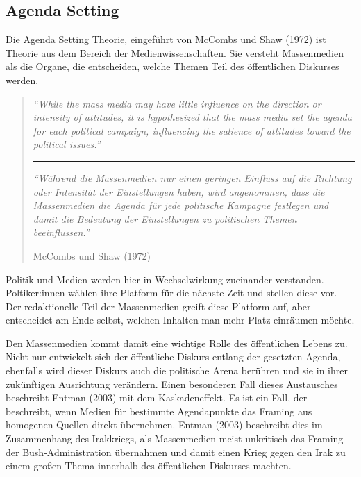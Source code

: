 \documentclass[
  11pt,
]{article}
\begin{document}
\hypertarget{agenda-setting}{%
\subsection{Agenda Setting}\label{agenda-setting}}

Die Agenda Setting Theorie, eingeführt von McCombs und Shaw (1972) ist
Theorie aus dem Bereich der Medienwissenschaften. Sie versteht
Massenmedien als die Organe, die entscheiden, welche Themen Teil des
öffentlichen Diskurses werden.

\begin{quote}
\emph{``While the mass media may have little influence on the direction
or intensity of attitudes, it is hypothesized that the mass media set
the agenda for each political campaign, influencing the salience of
attitudes toward the political issues.''}

\begin{center}\rule{0.5\linewidth}{0.5pt}\end{center}

\emph{``Während die Massenmedien nur einen geringen Einfluss auf die
Richtung oder Intensität der Einstellungen haben, wird angenommen, dass
die Massenmedien die Agenda für jede politische Kampagne festlegen und
damit die Bedeutung der Einstellungen zu politischen Themen
beeinflussen.''}

McCombs und Shaw (1972)
\end{quote}

Politik und Medien werden hier in Wechselwirkung zueinander verstanden.
Poltiker:innen wählen ihre Platform für die nächste Zeit und stellen
diese vor. Der redaktionelle Teil der Massenmedien greift diese Platform
auf, aber entscheidet am Ende selbst, welchen Inhalten man mehr Platz
einräumen möchte.

Den Massenmedien kommt damit eine wichtige Rolle des öffentlichen Lebens
zu. Nicht nur entwickelt sich der öffentliche Diskurs entlang der
gesetzten Agenda, ebenfalls wird dieser Diskurs auch die politische
Arena berühren und sie in ihrer zukünftigen Ausrichtung verändern. Einen
besonderen Fall dieses Austausches beschreibt Entman (2003) mit dem
Kaskadeneffekt. Es ist ein Fall, der beschreibt, wenn Medien für
bestimmte Agendapunkte das Framing aus homogenen Quellen direkt
übernehmen. Entman (2003) beschreibt dies im Zusammenhang des
Irakkriegs, als Massenmedien meist unkritisch das Framing der
Bush-Administration übernahmen und damit einen Krieg gegen den Irak zu
einem großen Thema innerhalb des öffentlichen Diskurses machten.
\end{document}
